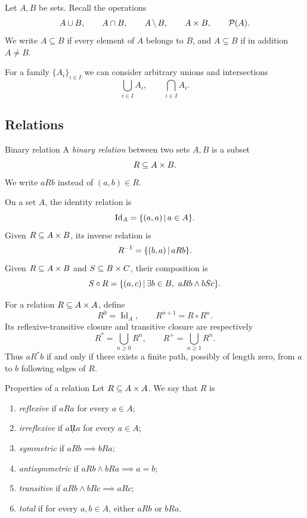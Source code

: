 \documentclass[a4paper]{article}
\newcommand{\Id}{\operatorname{Id}}
\begin{document}
Let \(A,B\) be sets.
Recall the operations
\[
    A\cup B,
    \qquad
    A\cap B,
    \qquad
    A\,\backslash\, B,
    \qquad
    A\times B,
    \qquad
    \mathcal P(A).
\]
We write \(A\subseteq B\) if every element of \(A\) belongs to \(B\), and \(A\subsetneq B\) if in addition \(A\neq B\).

For a family \(\{A_i\}_{i\in I}\) we can consider arbitrary unions and intersections
\[
    \bigcup_{i\in I}A_i,
    \qquad
    \bigcap_{i\in I}A_i.
\]

\subsection{Relations}

\begin{snippetdefinition}{Binary relation}
    A \emph{binary relation} between two sets \(A,B\) is a subset
    \[
        R\subseteq A\times B.
    \]
    We write \(aRb\) instead of \((a,b)\in R\).
\end{snippetdefinition}

On a set \(A\), the identity relation is
\[
    \Id_A = \{(a,a)\suchthat a\in A\}.
\]
Given \(R\subseteq A\times B\), its inverse relation is
\[
    R^{-1}=\{(b,a)\,|\, aRb\}.
\]
Given \(R\subseteq A\times B\) and \(S\subseteq B\times C\), their composition is
\[
    S\circ R
    =\{(a,c)\,|\, \exists b\in B,\ aRb \land bSc\}.
\]

For a relation \(R\subseteq A\times A\), define
\[
    R^0=\Id_A,
    \qquad
    R^{n+1}=R\circ R^n.
\]
Its reflexive-transitive closure and transitive closure are respectively
\[
    R^* = \bigcup_{n\geq 0}R^n,
    \qquad
    R^+ = \bigcup_{n\geq 1}R^n.
\]
Thus \(aR^*b\) if and only if there exists a finite path, possibly of length zero, from \(a\) to \(b\) following edges of \(R\).

\begin{snippetdefinition}{Properties of a relation}
    Let \(R\subseteq A\times A\). We say that \(R\) is
    \begin{enumerate}
        \item \emph{reflexive} if \(aRa\) for every \(a\in A\);
        \item \emph{irreflexive} if \(a\not R a\) for every \(a\in A\);
        \item \emph{symmetric} if \(aRb\implies bRa\);
        \item \emph{antisymmetric} if \(aRb\land bRa\implies a=b\);
        \item \emph{transitive} if \(aRb\land bRc\implies aRc\);
        \item \emph{total} if for every \(a,b\in A\), either \(aRb\) or \(bRa\).
    \end{enumerate}
\end{snippetdefinition}
\end{document}
